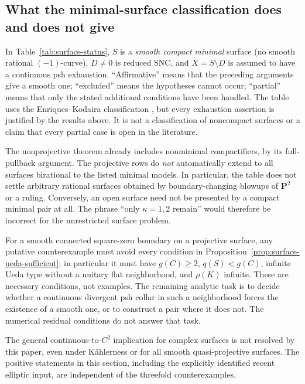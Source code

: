 \documentclass[11pt]{amsart}
\theoremstyle{definition}
\theoremstyle{remark}
\numberwithin{equation}{section}
\newcommand{\PP}{\mathbf P}
\begin{document}
\subsection{What the minimal-surface classification does and does not give}
\label{subsec:surface-classification}

In Table~\ref{tab:surface-status}, $S$ is a \emph{smooth compact minimal}
surface (no smooth rational $(-1)$-curve), $D\ne0$ is reduced SNC, and
$X=S\setminus D$ is assumed to have a continuous psh exhaustion.
``Affirmative'' means that the preceding arguments give a smooth one;
``excluded'' means the hypotheses cannot occur; ``partial'' means
that only the stated additional conditions have been handled. The
table uses the Enriques--Kodaira classification
\cite[Chapter~VI]{BHPV2004}, but every exhaustion assertion is justified
by the results above. It is not a classification of noncompact
surfaces or a claim that every partial case is open in the literature.



The nonprojective theorem already includes nonminimal compactifiers,
by its full-pullback argument. The projective rows do \emph{not}
automatically extend to all surfaces birational to the listed minimal
models. In particular, the table does not settle arbitrary rational
surfaces obtained by boundary-changing blowups of $\PP^2$ or a ruling.
Conversely, an open surface need not be presented by a compact minimal
pair at all. The phrase ``only $\kappa=1,2$ remain'' would therefore
be incorrect for the unrestricted surface problem.

For a smooth connected square-zero boundary on a projective surface,
any putative counterexample must avoid every condition in
Proposition~\ref{prop:surface-ueda-sufficient}; in particular it must
have $g(C)\ge2$, $q(S)<g(C)$, infinite Ueda type without a unitary
flat neighborhood, and $\rho(K)$ infinite. These are necessary
conditions, not examples. The remaining analytic task is to decide
whether a continuous divergent psh collar in such a neighborhood
forces the existence of a smooth one, or to construct a pair where it
does not. The numerical residual conditions do not answer that task.

The general continuous-to-$C^2$ implication for complex surfaces is
not resolved by this paper, even under K\"ahlerness or for all smooth
quasi-projective surfaces. The positive statements in this section,
including the explicitly identified recent elliptic input, are
independent of the threefold counterexamples.
\end{document}
